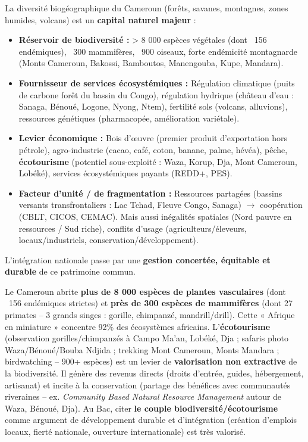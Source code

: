 \documentclass[11pt]{article}
\begin{document}
\begin{aretenir}
La diversité biogéographique du Cameroun (forêts, savanes, montagnes, zones humides, volcans) est un \textbf{capital naturel majeur} :
\begin{itemize}
    \item \textbf{Réservoir de biodiversité :} > 8 000 espèces végétales (dont ~156 endémiques), ~300 mammifères, ~900 oiseaux, forte endémicité montagnarde (Monts Cameroun, Bakossi, Bamboutos, Manengouba, Kupe, Mandara).
    \item \textbf{Fournisseur de services écosystémiques :} Régulation climatique (puits de carbone forêt du bassin du Congo), régulation hydrique (château d'eau : Sanaga, Bénoué, Logone, Nyong, Ntem), fertilité sols (volcans, alluvions), ressources génétiques (pharmacopée, amélioration variétale).
    \item \textbf{Levier économique :} Bois d'œuvre (premier produit d'exportation hors pétrole), agro-industrie (cacao, café, coton, banane, palme, hévéa), pêche, \textbf{écotourisme} (potentiel sous-exploité : Waza, Korup, Dja, Mont Cameroun, Lobéké), services écosystémiques payants (REDD+, PES).
    \item \textbf{Facteur d'unité / de fragmentation :} Ressources partagées (bassins versants transfrontaliers : Lac Tchad, Fleuve Congo, Sanaga) $\rightarrow$ coopération (CBLT, CICOS, CEMAC). Mais aussi inégalités spatiales (Nord pauvre en ressources / Sud riche), conflits d'usage (agriculteurs/éleveurs, locaux/industriels, conservation/développement).
\end{itemize}
L'intégration nationale passe par une \textbf{gestion concertée, équitable et durable} de ce patrimoine commun.
\end{aretenir}

\begin{savaistu}
Le Cameroun abrite \textbf{plus de 8 000 espèces de plantes vasculaires} (dont ~156 endémiques strictes) et \textbf{près de 300 espèces de mammifères} (dont 27 primates -- 3 grands singes : gorille, chimpanzé, mandrill/drill). Cette « Afrique en miniature » concentre 92\% des écosystèmes africains. 
L'\textbf{écotourisme} (observation gorilles/chimpanzés à Campo Ma'an, Lobéké, Dja ; safaris photo Waza/Bénoué/Bouba Ndjida ; trekking Mont Cameroun, Monts Mandara ; birdwatching -- 900+ espèces) est un levier de \textbf{valorisation non extractive} de la biodiversité. Il génère des revenus directs (droits d'entrée, guides, hébergement, artisanat) et incite à la conservation (partage des bénéfices avec communautés riveraines -- ex. \emph{Community Based Natural Resource Management} autour de Waza, Bénoué, Dja). Au Bac, citer \textbf{le couple biodiversité/écotourisme} comme argument de développement durable et d'intégration (création d'emplois locaux, fierté nationale, ouverture internationale) est très valorisé.
\end{savaistu}
\end{document}
